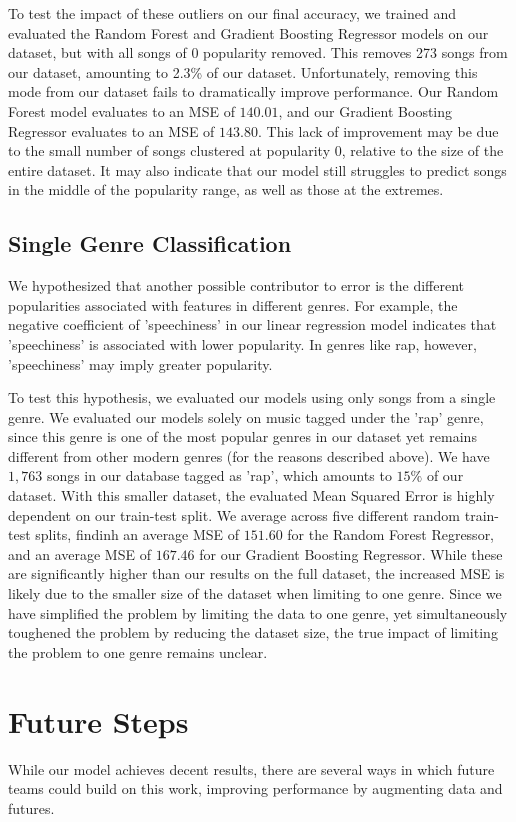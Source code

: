 \documentclass[journal]{IEEEtran}
\begin{document}
To test the impact of these outliers on our final accuracy, we trained and evaluated the Random Forest and Gradient Boosting Regressor models on our dataset, but with all songs of 0 popularity removed. This removes 273 songs from our dataset, amounting to 2.3\% of our dataset. Unfortunately, removing this mode from our dataset fails to dramatically improve performance. Our Random Forest model evaluates to an MSE of $140.01$, and our Gradient Boosting Regressor evaluates to an MSE of $143.80$. This lack of improvement may be due to the small number of songs clustered at popularity 0, relative to the size of the entire dataset. It may also indicate that our model still struggles to predict songs in the middle of the popularity range, as well as those at the extremes.

\subsection{Single Genre Classification}
We hypothesized that another possible contributor to error is the different popularities associated with features in different genres. For example, the negative coefficient of 'speechiness' in our linear regression model indicates that 'speechiness' is associated with lower popularity. In genres like rap, however, 'speechiness' may imply greater popularity.

To test this hypothesis, we evaluated our models using only songs from a single genre. We evaluated our models solely on music tagged under the 'rap' genre, since this genre is one of the most popular genres in our dataset yet remains different from other modern genres (for the reasons described above). We have $1,763$ songs in our database tagged as 'rap', which amounts to $15\%$ of our dataset. With this smaller dataset, the evaluated Mean Squared Error is highly dependent on our train-test split. We average across five different random train-test splits, findinh an average MSE of $151.60$ for the Random Forest Regressor, and an average MSE of $167.46$ for our Gradient Boosting Regressor. While these are significantly higher than our results on the full dataset, the increased MSE is likely due to the smaller size of the dataset when limiting to one genre. Since we have simplified the problem by limiting the data to one genre, yet simultaneously toughened the problem by reducing the dataset size, the true impact of limiting the problem to one genre remains unclear.

\section{Future Steps}
While our model achieves decent results, there are several ways in which future teams could build on this work, improving performance by augmenting data and futures.
\end{document}
